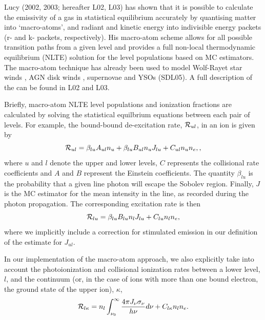 \documentclass[preprint, a4paper, 11pt]{aastex}
\begin{document}
Lucy (2002, 2003\nocite{lucy2002, lucy2003}; hereafter L02, L03) 
has shown that it is possible to calculate the emissivity of a gas in
statistical equilibrium accurately by quantising matter into
`macro-atoms', and radiant and kinetic energy into indivisible energy
packets (r- and k- packets, respectively). His macro-atom scheme
allows for all possible transition paths from a given level and
provides a full non-local thermodynamic equilibrium (NLTE) solution
for the level populations based on MC estimators. The macro-atom
technique has already been used to model Wolf-Rayet star
winds \citep{sim2004}, AGN disk winds \citep{simlong2008, tatum2012},
supernovae \citep{kasen2006, kerzendorfsim} and YSOs (SDL05). A full 
description of the can be found in L02 and L03. 

Briefly, macro-atom NLTE level populations and ionization fractions
are calculated by solving the statistical equilbrium equations between
each pair of levels. For example, the bound-bound de-excitation rate,
${\cal R}_{ul}$, in an ion is given by  
\begin{equation}
{\cal R}_{ul} = \beta_{lu} A_{ul} n_u + \beta_{lu} B_{ul} n_u J_{lu} +
C_{ul} n_u n_e,\label{eq:nlte_rul},
\end{equation}
where $u$ and $l$ denote the upper and lower levels, $C$ represents the
collisional rate coefficients and $A$ and $B$ represent the Einstein
coefficients. The quantity $\beta_{lu}$ is the probability that a
given line photon will escape the Sobolev region. Finally, $J$ is the
MC estimator for the mean intensity in the line, as recorded during
the photon propagation. The corresponding excitation rate is then 
\begin{equation}
{\cal R}_{lu} = \beta_{lu} B_{lu} n_l J_{lu} + C_{lu} n_l n_e,
\end{equation}
where we implicitly include a correction for stimulated emission in
our definition of the estimate for $J_{ul}$. 

In our implementation of the macro-atom approach, we also explicitly
take into account the photoionization and collisional ionization rates
between a lower level, $l$, and the continuum (or, in the case of ions
with more than one bound electron, the ground state of the upper ion),
$\kappa$,
\begin{equation}
{\cal R}_{l \kappa}= n_l \int_{\nu_0}^{\infty} \frac{ 4 \pi J_{\nu}
  \sigma_{\nu}}{h \nu} d\nu + C_{l \kappa} n_l n_e.
\end{equation}
\end{document}
